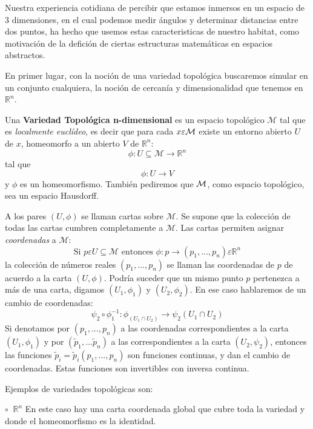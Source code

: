 Nuestra experiencia cotidiana de percibir que estamos inmersos en un espacio de 3 dimensiones, en el cual podemos medir \'angulos y determinar distancias entre dos puntos, ha hecho que usemos estas caracteristicas de nuestro habitat, como motivaci\'on de la defici\'on de ciertas estructuras matem\'aticas en espacios abstractos.

En primer lugar, con la noci\'on de una variedad topol\'ogica buscaremos simular en un conjunto cualquiera, la noci\'on de cercan\'ia y dimensionalidad que tenemos en $\mathbb{R}^n$.

\begin{definicion}
Una {\bf Variedad Topol\'ogica n-dimensional} es un espacio topol\'ogico $\mathcal{M}$ tal que es {\it localmente eucl\'ideo}, es decir que para cada $x \varepsilon {\cal{M}}$ existe un entorno abierto $U$ de $x$, homeomorfo a un abierto $V$ de $\mathbb{R}^n$:
\[
\phi: U \subseteq {\mathcal{M}} \rightarrow \mathbb{R}^n
\]
tal que
\[
\phi:U \rightarrow V
\]
y $\phi$ es un homeomorfismo. Tambi\'en pediremos que $\cal{M}$, como espacio topol\'ogico, sea un espacio Hausdorff.
\end{definicion}
A los pares $(U,\phi)$ se llaman cartas sobre $\mathcal{M}$. Se supone que la colecci\'on de todas las cartas cumbren completamente a $\mathcal{M}$. Las cartas permiten asignar {\it coordenadas} a $\mathcal{M}$:
\[
\text{Si  }p \varepsilon U \subseteq \mathcal{M} \text{   entonces  } \phi: p \rightarrow (p_1,...,p_n) \varepsilon\mathbb{R}^n  
\]
la colecci\'on de n\'umeros reales $(p_1,...,p_n)$ se llaman las coordenadas de $p$ de acuerdo a la carta $(U,\phi)$. Podr\'ia suceder que un mismo punto $p$ pertenezca a m\'as de una carta, digamos $(U_1,\phi_1)$ y $(U_2, \phi_2)$. En ese caso hablaremos de un cambio de coordenadas:
\begin{equation}\label{cc}
  \psi_2 \circ \phi_1^{-1}: \phi_(U_1 \cap U_2) \rightarrow \psi_2(U_1 \cap U_2)
\end{equation}
Si denotamos por $(p_1,...,p_n)$ a las coordenadas correspondientes a la carta $(U_1,\phi_1)$ y por $(\tilde{p}_1,...\tilde{p}_n)$ a las correspondientes a la carta $(U_2,\psi_2)$, entonces las funciones $\tilde{p}_i = \tilde{p}_i(p_1,...,p_n)$ son funciones continuas, y dan el cambio de coordenadas. Estas funciones son invertibles con inversa continua.

Ejemplos de variedades topol\'ogicas son:

$\circ \;\; \mathbb{R}^n$ En este caso hay una carta coordenada global que cubre toda la variedad y donde el homeomorfismo es la identidad.

